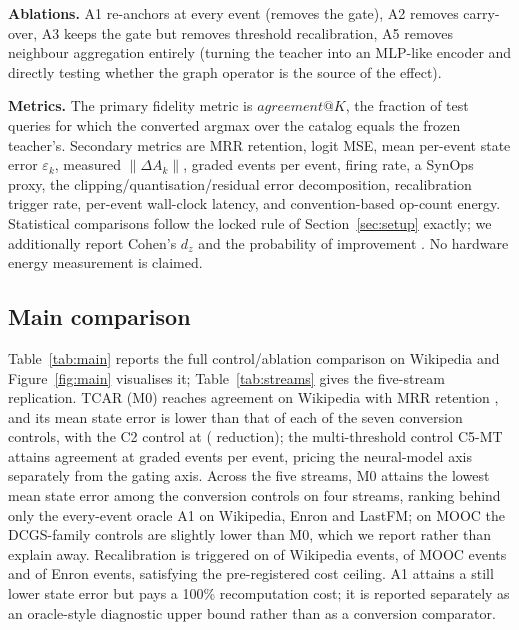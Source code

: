 \documentclass[preprint,12pt]{elsarticle}
\begin{document}
\textbf{Ablations.} A1 re-anchors at every event (removes the gate), A2 removes carry-over, A3 keeps the gate but removes threshold recalibration, A5 removes neighbour aggregation entirely (turning the teacher into an MLP-like encoder and directly testing whether the graph operator is the source of the effect).

\textbf{Metrics.} The primary fidelity metric is $\mathit{agreement@}K$, the fraction of test queries for which the converted argmax over the catalog equals the frozen teacher's. Secondary metrics are MRR retention, logit MSE, mean per-event state error $\varepsilon_k$, measured $\|\Delta A_k\|$, graded events per event, firing rate, a SynOps proxy, the clipping/quantisation/residual error decomposition, recalibration trigger rate, per-event wall-clock latency, and convention-based op-count energy. Statistical comparisons follow the locked rule of Section~\ref{sec:setup} exactly; we additionally report Cohen's $d_z$ and the probability of improvement \cite{cohen1988,agarwal2021}. No hardware energy measurement is claimed.

\subsection{Main comparison}
\label{sec:main}

Table~\ref{tab:main} reports the full control/ablation comparison on Wikipedia and Figure~\ref{fig:main} visualises it; Table~\ref{tab:streams} gives the five-stream replication. TCAR (M0) reaches agreement \AgreeWikipedia{} on Wikipedia with MRR retention \RetWikipedia{}, and its mean state error \EpsMzeroWikipedia{} is lower than that of each of the seven conversion controls, with the C2 control at \EpsCtwoWikipedia{} (\RedWikipedia{} reduction); the multi-threshold control C5-MT attains \AgreeCfivemtWikipedia{} agreement at \EvCfivemtWikipedia{} graded events per event, pricing the neural-model axis separately from the gating axis. Across the five streams, M0 attains the lowest mean state error among the conversion controls on four streams, ranking behind only the every-event oracle A1 on Wikipedia, Enron and LastFM; on MOOC the DCGS-family controls are slightly lower than M0, which we report rather than explain away. Recalibration is triggered on \TrigWikipedia{} of Wikipedia events, \TrigMooc{} of MOOC events and \TrigEnron{} of Enron events, satisfying the pre-registered cost ceiling. A1 attains a still lower state error but pays a 100\% recomputation cost; it is reported separately as an oracle-style diagnostic upper bound rather than as a conversion comparator.
\end{document}
